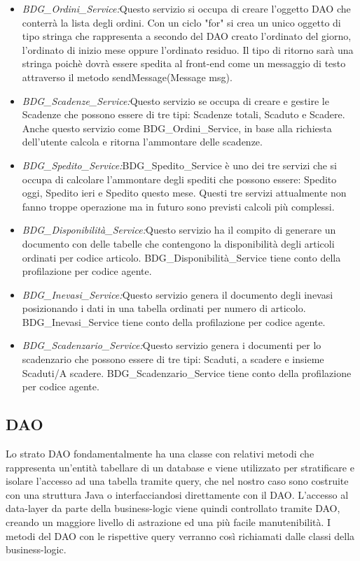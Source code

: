 \begin{itemize}

\item \textit{BDG\_Ordini\_Service:}Questo servizio si occupa di creare l'oggetto DAO che conterrà la lista degli ordini. Con un ciclo "for" si crea un unico oggetto di tipo stringa che rappresenta a secondo del DAO creato l'ordinato del giorno, l'ordinato di inizio mese oppure l'ordinato residuo. Il tipo di ritorno sarà una stringa poichè dovrà essere spedita al front-end come un messaggio di testo attraverso il metodo sendMessage(Message msg).

\item \textit{BDG\_Scadenze\_Service:}Questo servizio se occupa di creare e gestire le Scadenze che possono essere di tre tipi: Scadenze totali, Scaduto e Scadere. Anche questo servizio come BDG\_Ordini\_Service, in base alla richiesta dell'utente calcola e ritorna l'ammontare delle scadenze.

\item \textit{BDG\_Spedito\_Service:}BDG\_Spedito\_Service è uno dei tre servizi che si occupa di calcolare l'ammontare degli spediti che possono essere: Spedito oggi, Spedito ieri e Spedito questo mese. Questi tre servizi attualmente non fanno troppe operazione ma in futuro sono previsti calcoli più complessi.

\item \textit{BDG\_Disponibilità\_Service:}Questo servizio ha il compito di generare un documento con delle tabelle che contengono  la disponibilità degli articoli ordinati per codice articolo. BDG\_Disponibilità\_Service tiene conto della profilazione per codice agente.

\item \textit{BDG\_Inevasi\_Service:}Questo servizio genera il documento degli inevasi posizionando i dati in una tabella ordinati per numero di articolo. BDG\_Inevasi\_Service tiene conto della profilazione per codice agente.

\item \textit{BDG\_Scadenzario\_Service:}Questo servizio genera i documenti per lo scadenzario che possono essere di tre tipi: Scaduti, a scadere e insieme Scaduti/A scadere. BDG\_Scadenzario\_Service tiene conto della profilazione per codice agente.

\end{itemize}

\subsection{DAO}
Lo strato DAO fondamentalmente ha una classe con relativi metodi che rappresenta
un'entità tabellare di un database e viene utilizzato per stratificare e isolare l'accesso
ad una tabella tramite query, che nel nostro caso sono costruite con una struttura Java
o interfacciandosi direttamente con il DAO. L'accesso al data-layer da parte della
business-logic viene quindi controllato tramite DAO, creando un maggiore livello di
astrazione ed una più facile manutenibilità. I metodi del DAO con le rispettive query
verranno così richiamati dalle classi della business-logic.


